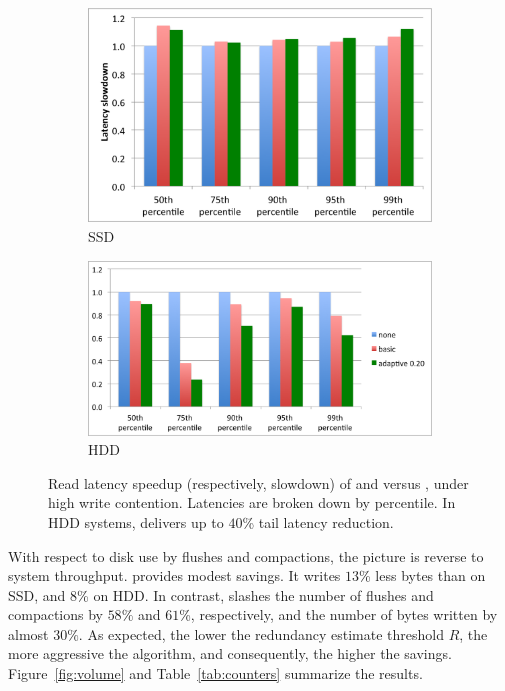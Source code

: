 \begin{figure}[t]
  \centering
  
  \begin{subfigure}[t]{.9\columnwidth}
      \includegraphics[width=\figw]{Figs/latency-ssd.png}
      \caption[]{SSD}
    \label{fig:latency:ssd}
  \end{subfigure}
  \begin{subfigure}[t]{1.1\columnwidth}
      \includegraphics[width=\figw]{Figs/latency-hdd.png}
      \caption[]{HDD}
    \label{fig:latency:hdd}
  \end{subfigure}

  \caption{Read latency speedup (respectively, slowdown) of \basic\/ and \adp\/ versus \none, under high write contention.
  Latencies are broken down by percentile. In HDD systems, \adp\/ delivers up to $40$\% tail latency reduction. 
  }
  
  \label{fig:latency}
\end{figure}

With respect to disk use by flushes and compactions, the picture is reverse to system throughput. 
\basic\/ provides modest savings. It writes $13$\% less bytes than \none\/ on SSD, and $8$\% 
on HDD. In contrast, \adp slashes the number of flushes and compactions by $58\%$ and $61$\%, 
respectively, and the number of bytes written by almost $30\%$. As expected, the lower the 
redundancy estimate threshold $R$, the more aggressive the algorithm, and consequently, 
the higher the savings. Figure~\ref{fig:volume} and Table~\ref{tab:counters} summarize the results. 

